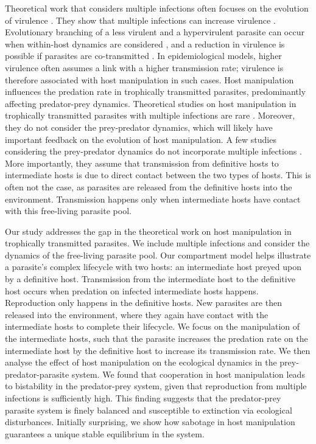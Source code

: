 \documentclass[11pt]{article}
\begin{document}
Theoretical work that considers multiple infections often focuses on the evolution of virulence \citep{vanBaalen1995, Alizon2013, Alizon2008, Choisy2010, Alizon2012}. 
They show that multiple infections can increase virulence \citep{vanBaalen1995, Choisy2010}.
Evolutionary branching of a less virulent and a hypervirulent parasite can occur when within-host dynamics are considered \citep{ Alizon2008}, and a reduction in virulence is possible if parasites are co-transmitted \citep{Alizon2012}. 
In epidemiological models, higher virulence often assumes a link with a higher transmission rate; virulence is therefore associated with host manipulation in such cases. 
Host manipulation influences the predation rate in trophically transmitted parasites, predominantly affecting predator-prey dynamics. 
Theoretical studies on host manipulation in trophically transmitted parasites with multiple infections are rare \citep{Parker2003,Vickery2009}. Moreover, they do not consider the prey-predator dynamics, which will likely have important feedback on the evolution of host manipulation. 
A few studies considering the prey-predator dynamics do not incorporate multiple infections \citep{Rogawa2018, Iritani2018, Hadeler1989, Fenton2006}. 
More importantly, they assume that transmission from definitive hosts to intermediate hosts is due to direct contact between the two types of hosts. 
This is often not the case, as parasites are released from the definitive hosts into the environment. 
Transmission happens only when intermediate hosts have contact with this free-living parasite pool.

Our study addresses the gap in the theoretical work on host manipulation in trophically transmitted parasites.
We include multiple infections and consider the dynamics of the free-living parasite pool. 
Our compartment model helps illustrate a parasite's complex lifecycle with two hosts: an intermediate host preyed upon by a definitive host. 
Transmission from the intermediate host to the definitive host occurs when predation on infected intermediate hosts happens. 
Reproduction only happens in the definitive hosts. 
New parasites are then released into the environment, where they again have contact with the intermediate hosts to complete their lifecycle. 
We focus on the manipulation of the intermediate hosts, such that the parasite increases the predation rate on the intermediate host by the definitive host to increase its transmission rate. 
We then analyse the effect of host manipulation on the ecological dynamics in the prey-predator-parasite system. 
We found that cooperation in host manipulation leads to bistability in the predator-prey system, given that reproduction from multiple infections is sufficiently high. 
This finding suggests that the predator-prey parasite system is finely balanced and susceptible to extinction via ecological disturbances.
Initially surprising, we show how sabotage in host manipulation guarantees a unique stable equilibrium in the system. 
\end{document}
